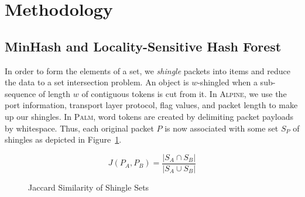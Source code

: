 \section{Methodology}

\subsection{MinHash and Locality-Sensitive Hash Forest}

In order to form the elements of a set, we \textit{shingle} packets into items and reduce the data to a set intersection problem. An object is $w$-shingled when a sub-sequence of length $w$ of contiguous tokens is cut from it. In \textsc{Alpine}, we use the port information, transport layer protocol, flag values, and packet length to make up our shingles. In \textsc{Palm}, word tokens are created by delimiting packet payloads by whitespace. Thus, each original packet $P$ is now associated with some set $S_P$ of shingles as depicted in Figure~\ref{jacsim}.

\begin{figure} [ht!]
\begin{equation}
J(P_A, P_B) = \frac{|S_A \cap S_B|}{|S_A \cup S_B|}
\end{equation}
\caption{Jaccard Similarity of Shingle Sets}
\label{jacsim}
\end{figure}

